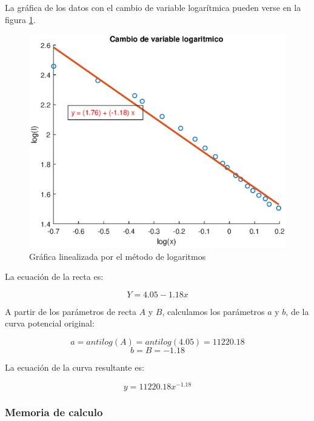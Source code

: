 \documentclass[letter,11pt]{article}
\begin{document}
La gráfica de los datos con el cambio de variable logarítmica pueden verse en la
figura \ref{practica31_2}.

\begin{figure}[!h]
\centering
\includegraphics[scale=1.00]{resources/3.1.2.eps}
\caption{Gráfica linealizada por el método de logaritmos}
\label{practica31_2}
\end{figure}

La ecuación de la recta es:

\begin{equation}
    Y = 4.05 - 1.18 x
\end{equation}

A partir de los parámetros de recta $A$ y $B$, calculamos los parámetros $a$ y
$b$, de la curva potencial original:

\begin{equation*}
    a = antilog(A) = antilog(4.05) = 11220.18
\end{equation*}
\begin{equation*}
    b = B = -1.18
\end{equation*}

La ecuación de la curva resultante es:

\begin{equation}
    y = 11220.18 x^{-1.18}
\end{equation}

\subsubsection{Memoria de calculo}
\end{document}
